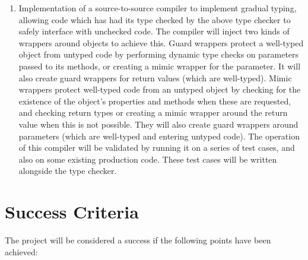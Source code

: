 \documentclass{article}
\begin{document}
\begin{enumerate}
		 \item Implementation of a source-to-source compiler to implement gradual typing, allowing code which has had its type checked by the above type checker to safely interface with unchecked code. The compiler will inject two kinds of wrappers around objects to achieve this. Guard wrappers protect a well-typed object from untyped code by performing dynamic type checks on parameters passed to its methods, or creating a mimic wrapper for the parameter. It will also create guard wrappers for return values (which are well-typed). Mimic wrappers protect well-typed code from an untyped object by checking for the existence of the object's properties and methods when these are requested, and checking return types or creating a mimic wrapper around the return value when this is not possible. They will also create guard wrappers around parameters (which are well-typed and entering untyped code). The operation of this compiler will be validated by running it on a series of test cases, and also on some existing production code. These test cases will be written alongside the type checker.
		\end{enumerate}

	\section{Success Criteria}\label{success-criteria}

		The project will be considered a success if the following points have been achieved:
\end{document}

